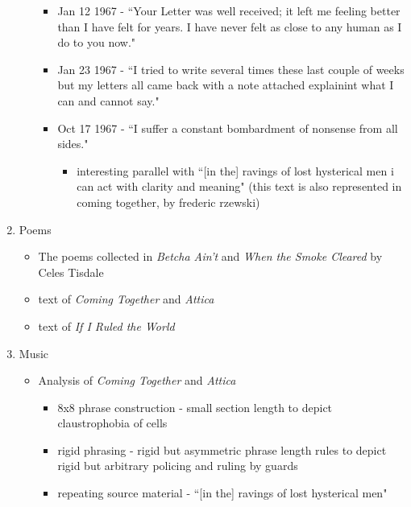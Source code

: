 \documentclass[14pt, letterpaper]{report}
\begin{document}
\begin{enumerate}
\begin{itemize}
\begin{itemize}
					\item   Jan 12 1967 - ``Your Letter was well received; it left me feeling better 
						than I have felt for years. I have never felt as close to any human as I 
						do to you now."\autocite[99]{soledad-brother}

					\item   Jan 23 1967 - ``I tried to write several times these last couple of weeks 
						but my letters all came back with a note attached explainint what I can and 
						cannot say."\autocite[101]{soledad-brother}

					\item   Oct 17 1967 - ``I suffer a constant bombardment of nonsense from all 
						sides."\autocite[139]{soledad-brother}
						\begin{itemize}
							\item interesting parallel with ``[in the] ravings of lost hysterical
							men i can act with clarity and meaning"\autocite[110]{letters-from-attica}
							(this text is also represented in coming together, by frederic rzewski)\autocite{coming-together}
						\end{itemize} 

				\end{itemize}
		
		\end{itemize}			

		\item   Poems
			\begin{itemize}
				
				\item The poems collected in \textit{Betcha Ain't} and \textit{When the Smoke Cleared} by Celes Tisdale
				
				\item text of \textit{Coming Together} and \textit{Attica}

				\item text of \textit{If I Ruled the World}				
		
			\end{itemize}

		\item   Music
			\begin{itemize}
				\item Analysis of \textit{Coming Together} and \textit{Attica}\autocite{prisoners-voices}
				\begin{itemize}
					\item   8x8 phrase  construction - small section length to depict claustrophobia of cells
					\item   rigid phrasing - rigid but asymmetric phrase length rules to depict rigid but 
						arbitrary policing and ruling by guards
					\item   repeating source material - ``[in the] ravings of lost hysterical men"
				\end{itemize}
				

\end{itemize}
\end{enumerate}
\end{document}
